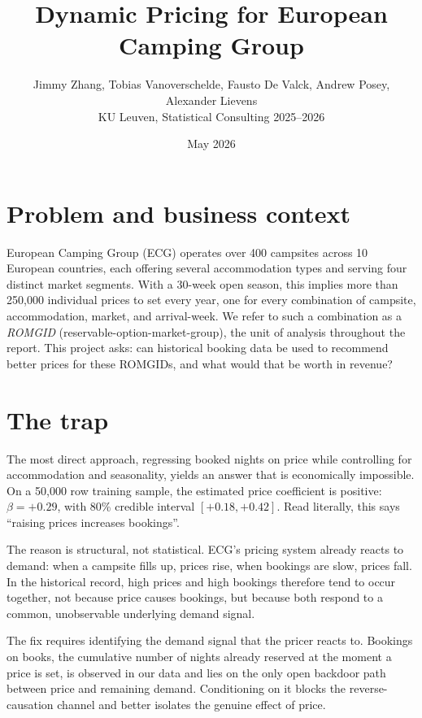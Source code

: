 \documentclass[11pt,a4paper]{article}
\title{Dynamic Pricing for European Camping Group}
\author{Jimmy Zhang, Tobias Vanoverschelde, Fausto De Valck, Andrew Posey, 
Alexander Lievens \\ KU Leuven, Statistical Consulting 2025--2026}
\date{May 2026}
\begin{document}
\maketitle

\section{Problem and business context}

European Camping Group (ECG) operates over 400 campsites across 10 European countries, each offering several accommodation types and serving four distinct market segments. With a 30-week open season, this implies more than 250{,}000 individual prices to set every year, one for every combination of campsite, accommodation, market, and arrival-week. We refer to such a combination as a \emph{ROMGID} (reservable-option-market-group), the unit of analysis throughout the report. This project asks: can historical booking data be used to recommend better prices for these ROMGIDs, and what would that be worth in revenue?

\section{The trap}

The most direct approach, regressing booked nights on price while controlling for accommodation and seasonality, yields an answer that is economically impossible. On a 50{,}000 row training sample, the estimated price coefficient is positive: $\beta = +0.29$, with 80\% credible interval $[+0.18, +0.42]$. Read literally, this says ``raising prices increases bookings''.

The reason is structural, not statistical. ECG's pricing system already reacts to demand: when a campsite fills up, prices rise, when bookings are slow, prices fall. In the historical record, high prices and high bookings therefore tend to occur together, not because price causes bookings, but because both respond to a common, unobservable underlying demand signal.

The fix requires identifying the demand signal that the pricer reacts to. Bookings on books, the cumulative number of nights already reserved at the moment a price is set, is observed in our data and lies on the only open backdoor path between price and remaining demand. Conditioning on it blocks the reverse-causation channel and better isolates the genuine effect of price.
\end{document}
